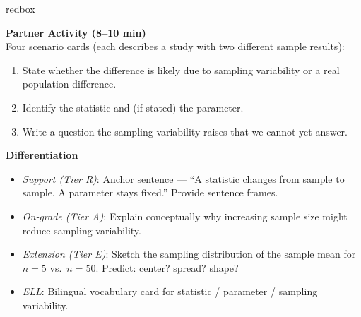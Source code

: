 \documentclass[10pt]{article}
\begin{document}
\begin{skillbox}{redbox}
\begin{minipage}[t]{0.48\linewidth}
    \textbf{Partner Activity (8--10 min)}\\
    Four scenario cards (each describes a study with two different sample results):
    \begin{enumerate}
        \item State whether the difference is likely due to sampling variability or a
              real population difference.
        \item Identify the statistic and (if stated) the parameter.
        \item Write a question the sampling variability raises that we cannot yet answer.
    \end{enumerate}
\end{minipage}
\hfill
\begin{minipage}[t]{0.48\linewidth}
    \textbf{Differentiation}
    \begin{itemize}
        \item \textit{Support (Tier R)}: Anchor sentence --- ``A statistic changes from
              sample to sample. A parameter stays fixed.'' Provide sentence frames.
        \item \textit{On-grade (Tier A)}: Explain conceptually why increasing sample
              size might reduce sampling variability.
        \item \textit{Extension (Tier E)}: Sketch the sampling distribution of the
              sample mean for $n = 5$ vs.\ $n = 50$. Predict: center? spread? shape?
        \item \textit{ELL}: Bilingual vocabulary card for statistic / parameter /
              sampling variability.
    \end{itemize}
\end{minipage}
\end{skillbox}
\end{document}
